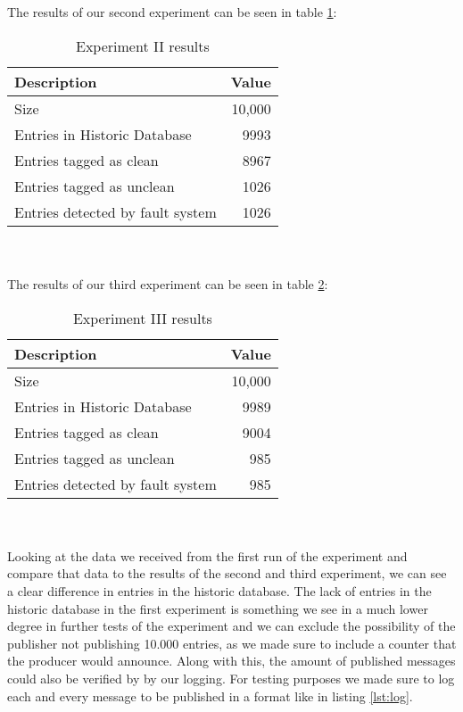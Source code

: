 \\\\
The results of our second experiment can be seen in table \ref{tab:ExpII}:
\begin{table}[h]
    \centering
    \caption{Experiment II results}
    \begin{tabular}{lr}
        \toprule
        \textbf{Description} & \textbf{Value} \\
        \midrule
        Size & 10,000 \\
        Entries in Historic Database & 9993 \\
        Entries tagged as clean & 8967 \\
        Entries tagged as unclean & 1026 \\
        Entries detected by fault system & 1026 \\
        \bottomrule
    \end{tabular}
    \label{tab:ExpII}
\end{table}
\\\\
The results of our third experiment can be seen in table \ref{tab:ExpIII}:
\begin{table}[h]
    \centering
    \caption{Experiment III results}
    \begin{tabular}{lr}
        \toprule
        \textbf{Description} & \textbf{Value} \\
        \midrule
        Size & 10,000 \\
        Entries in Historic Database & 9989 \\
        Entries tagged as clean & 9004 \\
        Entries tagged as unclean & 985 \\
        Entries detected by fault system & 985 \\
        \bottomrule
    \end{tabular}
    \label{tab:ExpIII}
\end{table}
\\\\
Looking at the data we received from the first run of the experiment and compare that data to the results of the second and third experiment, we can see a clear difference in entries in the historic database. 
The lack of entries in the historic database in the first experiment is something we see in a much lower degree in further tests of the experiment and we can exclude the possibility of the publisher not publishing 10.000 entries, as we made sure to include a counter that the producer would announce. Along with this, the amount of published messages could also be verified by by our logging. For testing purposes we made sure to log each and every message to be published in a format like in listing \ref{lst:log}.
    
